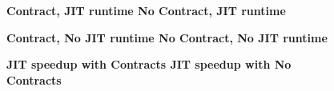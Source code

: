 \begin{landscape}

\begin{figure}[htb]
{\large \textbf{Contract, JIT runtime \hspace{6cm} No Contract, JIT runtime}}
\vspace{0.1cm}

\hspace{-1.2cm}\septable{}
\end{figure}

\begin{figure}[htb]
{\large \textbf{Contract, No JIT runtime \hspace{5.2cm} No Contract, No JIT runtime}}
\vspace{0.1cm}

\hspace{-1.2cm}\septable{}
\end{figure}

\begin{figure}[htb]
{\large \textbf{JIT speedup with Contracts \hspace{5cm} JIT speedup with No Contracts}}
\vspace{0.1cm}

\hspace{-1.2cm}\septable{}
\end{figure}
\end{landscape}

